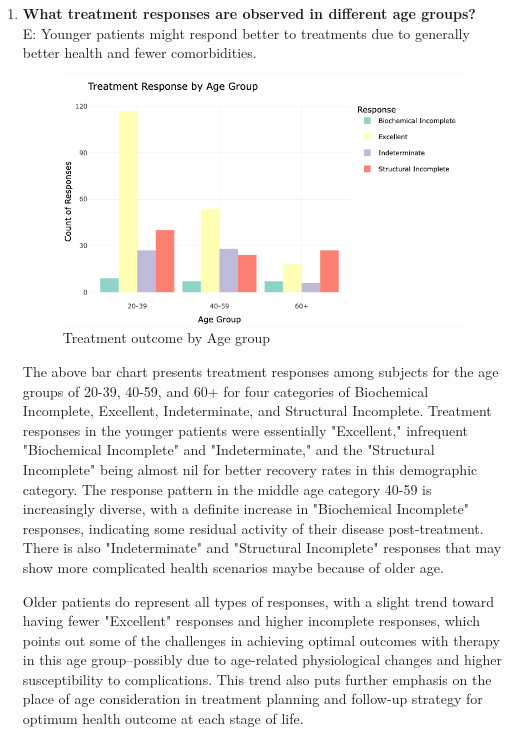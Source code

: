 \documentclass[12pt]{article}
\begin{document}
\begin{enumerate}
    \item \textbf{What treatment responses are observed in different age groups? } \\
    E: Younger patients might respond better to treatments due to generally better health and fewer comorbidities.
    \begin{figure}[h]
        \vspace{5pt}
        \centering
        \includegraphics[width=1.15\textwidth]{tretament by age.png}  
        \caption{Treatment outcome by Age group}
            \label{fig:example}
       \vspace{0.2cm}
    \end{figure}

    The above bar chart presents treatment responses among subjects for the age groups of 20-39, 40-59, and 60+ for four categories of Biochemical Incomplete, Excellent, Indeterminate, and Structural Incomplete. Treatment responses in the younger patients were essentially "Excellent," infrequent "Biochemical Incomplete" and "Indeterminate," and the "Structural Incomplete" being almost nil for better recovery rates in this demographic category. The response pattern in the middle age category 40-59 is increasingly diverse, with a definite increase in "Biochemical Incomplete" responses, indicating some residual activity of their disease post-treatment. There is also "Indeterminate" and "Structural Incomplete" responses that may show more complicated health scenarios maybe because of older age. 
    
    Older patients do represent all types of responses, with a slight trend toward having fewer "Excellent" responses and higher incomplete responses, which points out some of the challenges in achieving optimal outcomes with therapy in this age group--possibly due to age-related physiological changes and higher susceptibility to complications. This trend also puts further emphasis on the place of age consideration in treatment planning and follow-up strategy for optimum health outcome at each stage of life.


\end{enumerate}
\end{document}
